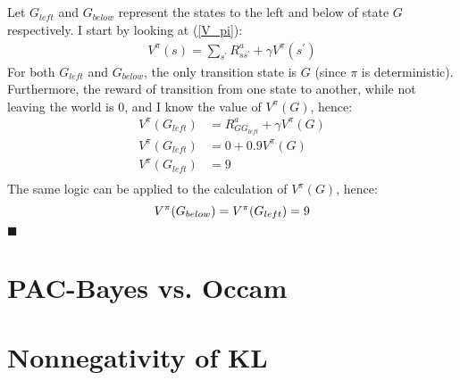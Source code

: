 \documentclass[a4paper]{article}
\newcommand*{\QEDA}{\hfill\ensuremath{\blacksquare}}%
\begin{document}
\subsection{}
\label{subsec:21}
Let $G_{left}$ and $G_{below}$ represent the states to the left and below of
state $G$ respectively. I start by looking at (\ref{V_pi}):
\begin{align*}
  V^{\pi}(s) = \sum_{s^{\prime}} R_{s s^{\prime}}^{a}+\gamma V^{\pi}\left(s^{\prime}\right)
\end{align*}
For both $G_{left}$ and $G_{below}$, the only transition state is $G$ (since
$\pi$ is deterministic). Furthermore, the reward of transition from one state to
another, while not leaving the world is 0, and I know the value of $V^{\pi}(G)$, hence:
\begin{align*}
  V^{\pi}(G_{left}) &= R_{G G_{left}}^{a}+\gamma V^{\pi}(G) \\
  V^{\pi}(G_{left}) &= 0+0.9 V^{\pi}(G) \\
  V^{\pi}(G_{left}) &= 9 \\
\end{align*}
The same logic can be applied to the calculation of $V^{\pi}(G)$, hence:
\[
  V^{\pi}(G_{below}) = V^{\pi}(G_{left}) = 9 \\
\]
\QEDA
\section{PAC-Bayes vs. Occam}
\label{sec:3}

\section{Nonnegativity of KL}
\label{sec:4}
\end{document}
